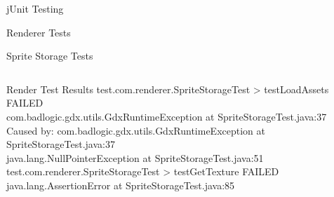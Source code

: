 \documentclass[12pt]{report}
\begin{document}
\begin{chapter}{jUnit Testing}
\begin{section}{Renderer Tests}
\begin{subsection}{Sprite Storage Tests}
\begin{lstlisting}
    \end{lstlisting}
   \end{subsection}
  \end{section}
  \begin{section}{Render Test Results}
  	test.com.renderer.SpriteStorageTest > testLoadAssets FAILED\\
    	com.badlogic.gdx.utils.GdxRuntimeException at SpriteStorageTest.java:37\\
        Caused by: com.badlogic.gdx.utils.GdxRuntimeException at SpriteStorageTest.java:37\\
    	java.lang.NullPointerException at SpriteStorageTest.java:51\\

	test.com.renderer.SpriteStorageTest > testGetTexture FAILED\\
	java.lang.AssertionError at SpriteStorageTest.java:85\\
  \end{section}
 \end{chapter}
\end{document}
